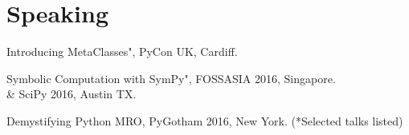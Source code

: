 \documentclass[]{deedy-resume-openfont}
\begin{document}
\begin{minipage}[t]{0.66\textwidth}

\section{Speaking}
\begin{tightemize}
\item Introducing MetaClasses", PyCon UK, Cardiff.
\item Symbolic Computation with SymPy", FOSSASIA 2016, Singapore.\\ \& SciPy 2016, Austin TX.
\item Demystifying Python MRO, PyGotham 2016, New York. (*Selected talks listed)
\end{tightemize}


% 
% 




\end{minipage} 
\end{document}
